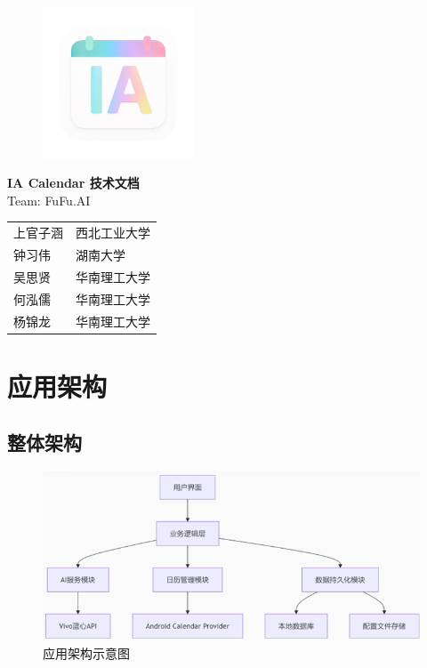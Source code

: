 \documentclass[fontset=windows]{ctexart}
\begin{document}
\begin{titlepage}
    \thispagestyle{empty}
    \vspace*{1cm}
    \centering
    \begin{figure}[h]
        \small
        \centering
        \includegraphics[width=0.4\textwidth]{./figure/LOGO.png}
    \end{figure}
    \vspace*{1cm}
    {\LARGE\bfseries IA Calendar 技术文档 \\[1.5em]}
    {\large Team: FuFu.AI \\[2em]}
    \vspace{1cm}
    {\normalsize
        \begin{tabular}{@{}ll@{}}
            上官子涵 & 西北工业大学 \\
            钟习伟  & 湖南大学   \\
            吴思贤  & 华南理工大学 \\
            何泓儒  & 华南理工大学 \\
            杨锦龙  & 华南理工大学 \\[2cm]
        \end{tabular}}

    \vfill
\end{titlepage}

\clearpage
\pagestyle{fancy}
\setcounter{page}{1}

\vspace{2cm}

\section{应用架构}
\subsection{整体架构}

\begin{figure}[h]
    \small
    \centering
    \includegraphics[width=12cm]{figure/structure.png}
    \caption{应用架构示意图} \label{fig:aa}
\end{figure}
\end{document}

